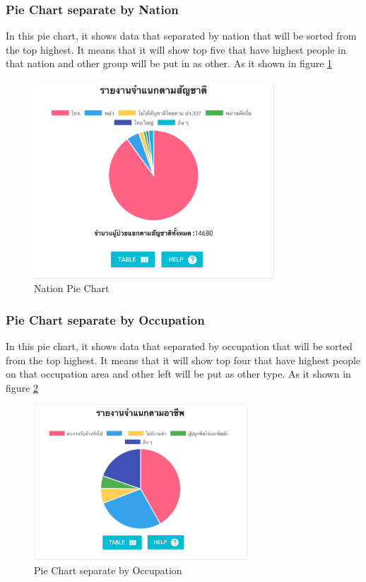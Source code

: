         \subsubsection{Pie Chart separate by Nation}
            In this pie chart, it shows data that separated by nation that will be sorted from the top highest. It means that it will show top five that have highest people in that nation and other group will be put in as other. As it shown in figure \ref{pie-graph-nation}
	
        	\FloatBarrier
            	\begin{figure}[h!]
                    \centering
                		\includegraphics[width=9cm]{images/chapter-05/pie-graph-nation.png}
                		\caption{Nation Pie Chart}
                		\label{pie-graph-nation}
                \end{figure}
        	\FloatBarrier
        \subsubsection{Pie Chart separate by Occupation}
            In this pie chart, it shows data that separated by occupation that will be sorted from the top highest. It means that it will show top four that have highest people on that occupation area and other left will be put as other type. As it shown in figure \ref{pie-graph-occupation}
	
        	\FloatBarrier
            	\begin{figure}[h!]
                    \centering
                		\includegraphics[width=8cm]{images/chapter-05/pie-graph-occupation.png}
                		\caption{Pie Chart separate by Occupation}
                		\label{pie-graph-occupation}
                \end{figure}
        	\FloatBarrier
	
